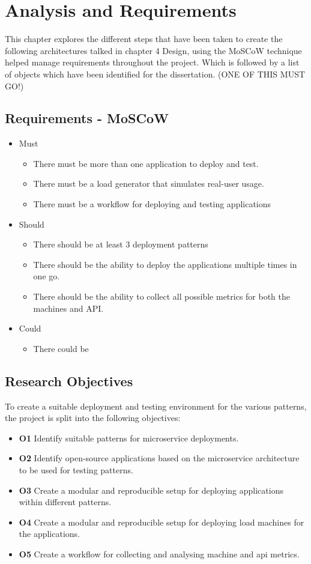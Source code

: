 
\chapter{Analysis and Requirements}\label{chp:AnR}
This chapter explores the different steps that have been taken to create the following architectures talked in chapter 4 Design, using the MoSCoW technique helped manage requirements throughout the project. Which is followed by a list of objects which have been identified for the dissertation. 
(ONE OF THIS MUST GO!)
\section{Requirements - MoSCoW}
\begin{itemize}
  \item Must
  \begin{itemize}
        \item There must be more than one application to deploy and test.
        \item There must be a load generator that simulates real-user usage. 
        \item There must be a workflow for deploying and testing applications
  \end{itemize}
  \item Should
  \begin{itemize}
    \item There should be at least 3 deployment patterns 
    \item There should be the ability to deploy the applications multiple times in one go. 
    \item There should be the ability to collect all possible metrics for both the machines and API.
  \end{itemize}
    \item Could
  \begin{itemize}
    \item There could be 
  \end{itemize}
\end{itemize}



\section{Research Objectives}
To create a suitable deployment and testing environment for the various patterns, the project is split into the following objectives:  
\begin{itemize}
    \item \textbf{O1} Identify suitable patterns for microservice deployments. 
    \item \textbf{O2} Identify open-source applications based on the microservice architecture to be used for testing patterns. 
    \item \textbf{O3} Create a modular and reproducible setup for deploying applications within different patterns. 
    \item \textbf{O4} Create a modular and reproducible setup for deploying load machines for the applications.
    \item \textbf{O5} Create a workflow for collecting and analysing machine and api metrics.
\end{itemize}